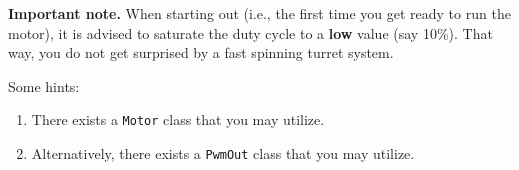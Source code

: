 \documentclass{exam}
\begin{document}
\textbf{Important note.} When starting out (i.e., the first time you get ready to run the motor), it is advised to saturate the duty cycle to a \textbf{low} value (say 10\%). That way, you do not get surprised by a fast spinning turret system.

Some hints:
\begin{enumerate}
\item There exists a \lstinline{Motor} class that you may utilize.
\item Alternatively, there exists a \lstinline{PwmOut} class that you may utilize.
\end{enumerate}
\end{document}
